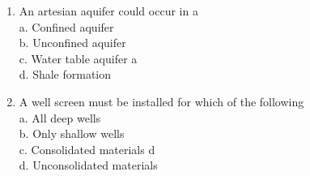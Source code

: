 \begin{enumerate}
\item An artesian aquifer could occur in a\\
a. Confined aquifer\\
b.  Unconfined aquifer\\
c.  Water table aquifer a\\
d.  Shale formation\\
\item A well screen must be installed for which of the following\\
a.  All deep wells\\
b.  Only shallow wells\\
c.  Consolidated materials  d\\
d.  Unconsolidated materials\\

\end{enumerate}

